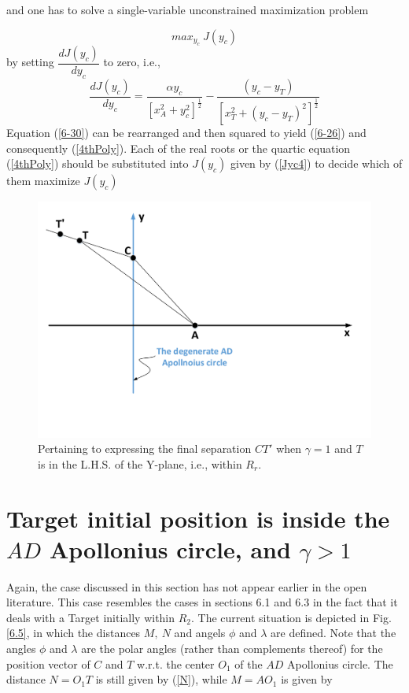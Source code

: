 and one has to solve a single-variable unconstrained maximization problem

\begin{equation}
max_{y_c}\ J(y_c)
\end{equation}
by setting $\dfrac{d J(y_c)}{d y_c}$ to zero, i.e.,
\begin{equation}
\dfrac{d J(y_c)}{d y_c} = \dfrac{\alpha y_c}{[x_A^2 + y_c^2]^{\frac{1}{2}}} - \dfrac{(y_c - y_T)}{[x_T^2 + (y_c - y_T)^2]^\frac{1}{2}}
\label{6-30}
\end{equation}
Equation (\ref{6-30}) can be rearranged and then squared to yield (\ref{6-26}) and consequently (\ref{4thPoly}). Each of the real roots or the quartic equation (\ref{4thPoly}) should be substituted into $J(y_c)$ given by (\ref{Jyc4}) to decide which of them maximize $J(y_c)$


\begin{figure}[htb]
\centering
\includegraphics[width=1.0\textwidth]{fig/Drawing6_3.pdf}
\caption{Pertaining to expressing the final separation $CT'$ when $\gamma=1$ and $T$ is in the L.H.S. of the Y-plane, i.e., within $R_r$.}
\label{6.3}
\end{figure}
\section{Target initial position is inside the $AD$ Apollonius circle, and $\gamma>1$}
Again, the case discussed in this section has not appear earlier in the open literature. This case resembles the cases in sections 6.1 and 6.3 in the fact that it deals with a Target initially within $R_2$. The current situation is depicted in Fig. \ref{6.5}, in which the distances $M,\ N$ and angels $\phi$ and $\lambda$ are defined. Note that the angles $\phi$ and $\lambda$ are the polar angles (rather than complements thereof) for the position vector of $C$ and $T$ w.r.t. the center $O_1$ of the $AD$ Apollonius circle. The distance $N= O_1 T$ is still given by (\ref{N}), while $M=AO_1$ is given by 

